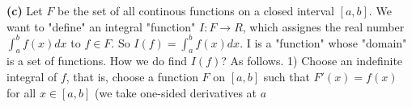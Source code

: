 \documentclass[11pt]{amsbook}
\begin{document}
\noindent
\textbf{(c)} Let $F$ be the set of all continous functions on a closed interval $[a, b]$. We want to "define" an integral "function" $I: F \rightarrow R$, which assignes the real number $\int_a^b f(x) dx$ to $f \in F$. So $I(f) = \int_a^b f(x)dx$. I is a "function" whose "domain" is a set of functions. How we do find $I(f)$? As follows. 1) Choose an indefinite integral of $f$, that is, choose a function $F$ on $[a, b]$ such that $F'(x) = f(x)$ for all $x \in [a, b]$ (we take one-sided derivatives at $a$ 








\end{document}
